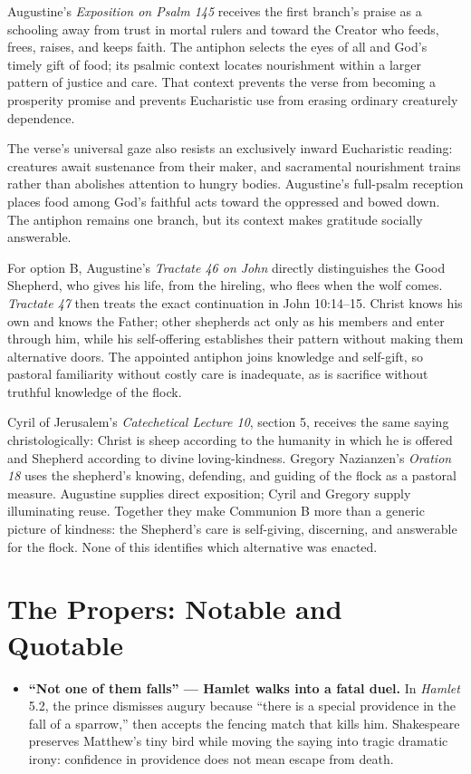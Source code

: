 \begin{deepstudy}
Augustine's \emph{Exposition on Psalm 145} receives the first branch's praise as a schooling away from trust in mortal rulers and toward the Creator who feeds, frees, raises, and keeps faith. The antiphon selects the eyes of all and God's timely gift of food; its psalmic context locates nourishment within a larger pattern of justice and care. That context prevents the verse from becoming a prosperity promise and prevents Eucharistic use from erasing ordinary creaturely dependence.

The verse's universal gaze also resists an exclusively inward Eucharistic reading: creatures await sustenance from their maker, and sacramental nourishment trains rather than abolishes attention to hungry bodies. Augustine's full-psalm reception places food among God's faithful acts toward the oppressed and bowed down. The antiphon remains one branch, but its context makes gratitude socially answerable.

For option B, Augustine's \emph{Tractate 46 on John} directly distinguishes the Good Shepherd, who gives his life, from the hireling, who flees when the wolf comes. \emph{Tractate 47} then treats the exact continuation in John 10:14--15. Christ knows his own and knows the Father; other shepherds act only as his members and enter through him, while his self-offering establishes their pattern without making them alternative doors. The appointed antiphon joins knowledge and self-gift, so pastoral familiarity without costly care is inadequate, as is sacrifice without truthful knowledge of the flock.

Cyril of Jerusalem's \emph{Catechetical Lecture 10}, section 5, receives the same saying christologically: Christ is sheep according to the humanity in which he is offered and Shepherd according to divine loving-kindness. Gregory Nazianzen's \emph{Oration 18} uses the shepherd's knowing, defending, and guiding of the flock as a pastoral measure. Augustine supplies direct exposition; Cyril and Gregory supply illuminating reuse. Together they make Communion B more than a generic picture of kindness: the Shepherd's care is self-giving, discerning, and answerable for the flock. None of this identifies which alternative was enacted.

\section*{The Propers: Notable and Quotable}

{\small
\begin{itemize}
\item \textbf{“Not one of them falls” --- Hamlet walks into a fatal duel.\enspace{}} In \emph{Hamlet} 5.2, the prince dismisses augury because “there is a special providence in the fall of a sparrow,” then accepts the fencing match that kills him. Shakespeare preserves Matthew's tiny bird while moving the saying into tragic dramatic irony: confidence in providence does not mean escape from death.


\end{itemize}}
\end{deepstudy}
